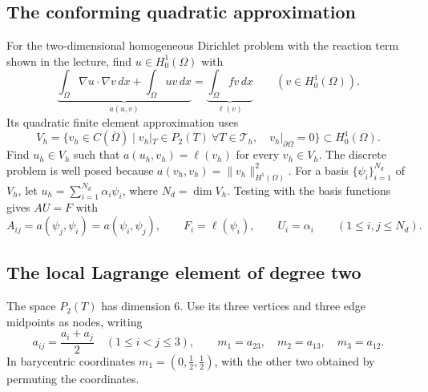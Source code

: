 \documentclass[11pt,a4paper]{article}
\begin{document}
\subsection{The conforming quadratic approximation}

For the two-dimensional homogeneous Dirichlet problem with the reaction term shown in the lecture, find \(u\in H_0^1(\Omega)\) with
\[
 \underbrace{\int_\Omega\nabla u\cdot\nabla v\,dx+
             \int_\Omega uv\,dx}_{a(u,v)}
   =\underbrace{\int_\Omega fv\,dx}_{\ell(v)}
   \qquad (v\in H_0^1(\Omega)).
\]
Its quadratic finite element approximation uses
\[
 V_h=\{v_h\in C(\overline\Omega)\mid
     v_h|_T\in P_2(T)\ \forall T\in\mathcal T_h,\quad
     v_h|_{\partial\Omega}=0\}\subset H_0^1(\Omega).
\]
Find \(u_h\in V_h\) such that \(a(u_h,v_h)=\ell(v_h)\) for every \(v_h\in V_h\). The discrete problem is well posed because \(a(v_h,v_h)=\|v_h\|_{H^1(\Omega)}^2\). For a basis \(\{\psi_i\}_{i=1}^{N_d}\) of \(V_h\), let \(u_h=\sum_{i=1}^{N_d}\alpha_i\psi_i\), where \(N_d=\dim V_h\). Testing with the basis functions gives \(AU=F\) with
\[
 A_{ij}=a(\psi_j,\psi_i)=a(\psi_i,\psi_j),\qquad
 F_i=\ell(\psi_i),\qquad U_i=\alpha_i
 \qquad(1\leq i,j\leq N_d).
\]

\subsection{The local Lagrange element of degree two}

The space \(P_2(T)\) has dimension \(6\). Use its three vertices and three edge midpoints as nodes, writing
\[
 a_{ij}=\frac{a_i+a_j}{2}\quad(1\leq i<j\leq3),\qquad
 m_1=a_{23},\quad m_2=a_{13},\quad m_3=a_{12}.
\]
In barycentric coordinates \(m_1=(0,\tfrac12,\tfrac12)\), with the other two obtained by permuting the coordinates.

\begin{center}
\end{center}
\end{document}
